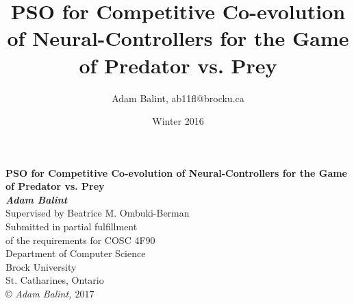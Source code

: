\documentclass[12pt, letterpaper]{article}
\title{PSO for Competitive Co-evolution of Neural-Controllers for the Game of Predator vs. Prey}
\author{Adam Balint, ab11fl@brocku.ca}
\date{Winter 2016}
\begin{document}
\begin{titlepage}
\begin{center}
{\LARGE {\bf PSO for Competitive Co-evolution of Neural-Controllers for the Game of Predator vs. Prey}}
\\[3cm]
{\large{ \bf \textit{Adam Balint}}}
{\large \\ Supervised by Beatrice M. Ombuki-Berman}
\\[3cm]
{\large Submitted in partial fulfillment\\ of the requirements for COSC 4F90}
\\[3cm]
{\large Department of Computer Science\\Brock University\\
St. Catharines, Ontario}
\\[4cm]
\copyright \textit{ Adam Balint, $ 2017 $}
\end{center}
\end{titlepage}




\newpage

\tableofcontents

\listoftables

\listoffigures

\newpage 














%
%

\end{document}
